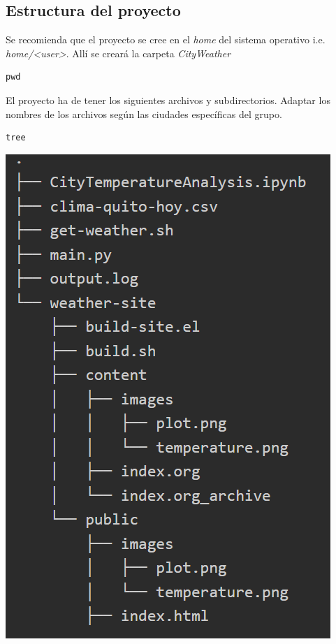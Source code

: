 \documentclass{article}
\begin{document}
\subsection{Estructura del proyecto}
\label{sec:orgaf53f15}
Se recomienda que el proyecto se cree en el \emph{home} del sistema
operativo i.e. \emph{home/<user>}. Allí se creará la carpeta \emph{CityWeather}
\begin{verbatim}
pwd
\end{verbatim}

El proyecto ha de tener los siguientes archivos y
subdirectorios. Adaptar los nombres de los archivos según las ciudades
específicas del grupo.

\begin{verbatim}
tree
\end{verbatim}

\begin{center}
\includegraphics[height=0.5\textheight]{../images/projectDirectories.png}
\end{center}
\end{document}
